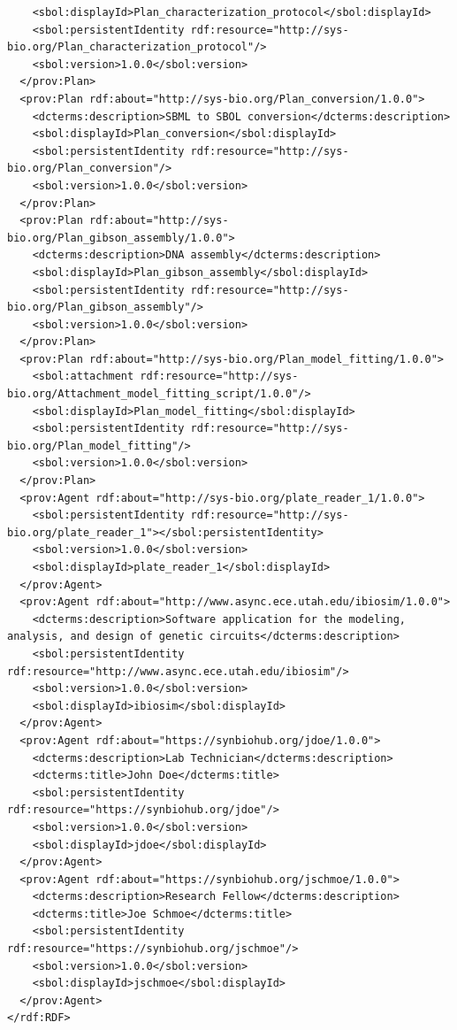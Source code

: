 \begin{lstlisting}
    <sbol:displayId>Plan_characterization_protocol</sbol:displayId>
    <sbol:persistentIdentity rdf:resource="http://sys-bio.org/Plan_characterization_protocol"/>
    <sbol:version>1.0.0</sbol:version>
  </prov:Plan>
  <prov:Plan rdf:about="http://sys-bio.org/Plan_conversion/1.0.0">
    <dcterms:description>SBML to SBOL conversion</dcterms:description>
    <sbol:displayId>Plan_conversion</sbol:displayId>
    <sbol:persistentIdentity rdf:resource="http://sys-bio.org/Plan_conversion"/>
    <sbol:version>1.0.0</sbol:version>
  </prov:Plan>
  <prov:Plan rdf:about="http://sys-bio.org/Plan_gibson_assembly/1.0.0">
    <dcterms:description>DNA assembly</dcterms:description>
    <sbol:displayId>Plan_gibson_assembly</sbol:displayId>
    <sbol:persistentIdentity rdf:resource="http://sys-bio.org/Plan_gibson_assembly"/>
    <sbol:version>1.0.0</sbol:version>
  </prov:Plan>
  <prov:Plan rdf:about="http://sys-bio.org/Plan_model_fitting/1.0.0">
    <sbol:attachment rdf:resource="http://sys-bio.org/Attachment_model_fitting_script/1.0.0"/>
    <sbol:displayId>Plan_model_fitting</sbol:displayId>
    <sbol:persistentIdentity rdf:resource="http://sys-bio.org/Plan_model_fitting"/>
    <sbol:version>1.0.0</sbol:version>
  </prov:Plan>
  <prov:Agent rdf:about="http://sys-bio.org/plate_reader_1/1.0.0">
    <sbol:persistentIdentity rdf:resource="http://sys-bio.org/plate_reader_1"></sbol:persistentIdentity>
    <sbol:version>1.0.0</sbol:version>
    <sbol:displayId>plate_reader_1</sbol:displayId>
  </prov:Agent>
  <prov:Agent rdf:about="http://www.async.ece.utah.edu/ibiosim/1.0.0">
    <dcterms:description>Software application for the modeling, analysis, and design of genetic circuits</dcterms:description>
    <sbol:persistentIdentity rdf:resource="http://www.async.ece.utah.edu/ibiosim"/>
    <sbol:version>1.0.0</sbol:version>
    <sbol:displayId>ibiosim</sbol:displayId>
  </prov:Agent>
  <prov:Agent rdf:about="https://synbiohub.org/jdoe/1.0.0">
    <dcterms:description>Lab Technician</dcterms:description>
    <dcterms:title>John Doe</dcterms:title>
    <sbol:persistentIdentity rdf:resource="https://synbiohub.org/jdoe"/>
    <sbol:version>1.0.0</sbol:version>
    <sbol:displayId>jdoe</sbol:displayId>
  </prov:Agent>
  <prov:Agent rdf:about="https://synbiohub.org/jschmoe/1.0.0">
    <dcterms:description>Research Fellow</dcterms:description>
    <dcterms:title>Joe Schmoe</dcterms:title>
    <sbol:persistentIdentity rdf:resource="https://synbiohub.org/jschmoe"/>
    <sbol:version>1.0.0</sbol:version>
    <sbol:displayId>jschmoe</sbol:displayId>
  </prov:Agent>
</rdf:RDF>
\end{lstlisting}

